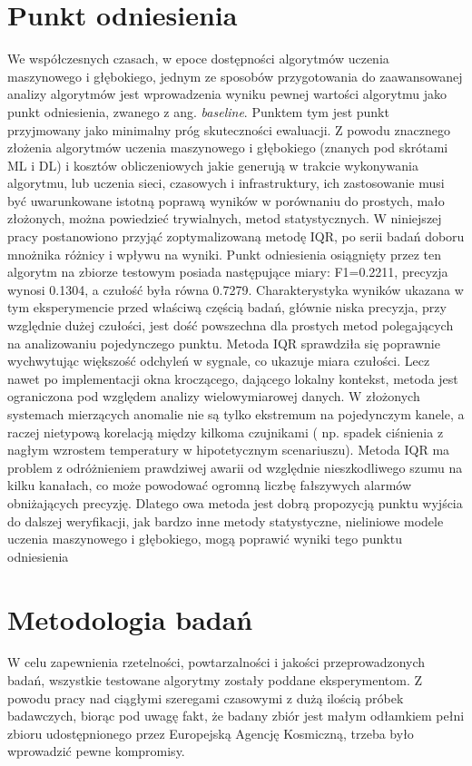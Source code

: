 \documentclass[a4paper,twoside,12pt]{book}
\newcommand{\obcy}[1]{\emph{#1}}
\newcommand{\english}[1]{{\selectlanguage{british}\obcy{#1}}}
\begin{document}
	\section{Punkt odniesienia}
	
	We współczesnych czasach, w epoce dostępności algorytmów uczenia maszynowego i głębokiego, jednym ze sposobów przygotowania do zaawansowanej analizy algorytmów jest wprowadzenia wyniku pewnej wartości algorytmu jako punkt odniesienia, zwanego z ang. \english{baseline}. Punktem tym jest punkt przyjmowany jako minimalny próg skuteczności ewaluacji. Z powodu znacznego złożenia algorytmów uczenia maszynowego i głębokiego (znanych pod skrótami ML i DL) i kosztów obliczeniowych jakie generują w trakcie wykonywania algorytmu, lub uczenia sieci, czasowych i infrastruktury, ich zastosowanie musi być uwarunkowane istotną poprawą wyników w porównaniu do prostych, mało złożonych, można powiedzieć trywialnych, metod statystycznych. 
	W niniejszej pracy postanowiono przyjąć zoptymalizowaną metodę IQR, po serii badań doboru mnożnika różnicy i wpływu na wyniki. Punkt odniesienia osiągnięty przez ten algorytm na zbiorze testowym posiada następujące miary: F1=0.2211, precyzja wynosi 0.1304, a czułość była równa 0.7279.
	Charakterystyka wyników ukazana w tym eksperymencie przed właściwą częścią badań, głównie niska precyzja, przy względnie dużej czułości, jest dość powszechna dla prostych metod polegających na analizowaniu pojedynczego punktu. Metoda IQR sprawdziła się poprawnie wychwytując większość odchyleń w sygnale, co ukazuje miara czułości. Lecz nawet po implementacji okna kroczącego, dającego lokalny kontekst, metoda jest ograniczona pod względem analizy wielowymiarowej danych. W złożonych systemach mierzących anomalie nie są tylko ekstremum na pojedynczym kanele, a raczej nietypową korelacją między kilkoma czujnikami ( np. spadek ciśnienia z nagłym wzrostem temperatury w hipotetycznym scenariuszu). Metoda IQR ma problem z odróżnieniem prawdziwej awarii od względnie nieszkodliwego szumu na kilku kanałach, co może powodować ogromną liczbę fałszywych alarmów obniżających precyzję. Dlatego owa metoda jest dobrą propozycją punktu wyjścia do dalszej weryfikacji, jak bardzo inne metody statystyczne, nieliniowe modele uczenia maszynowego i głębokiego, mogą poprawić wyniki tego punktu odniesienia 
	
	
	\section{Metodologia badań}
	W celu zapewnienia rzetelności, powtarzalności i jakości przeprowadzonych badań, wszystkie testowane algorytmy zostały poddane eksperymentom. Z powodu pracy nad ciągłymi szeregami czasowymi z dużą ilością próbek badawczych, biorąc pod uwagę fakt, że badany zbiór jest małym odłamkiem pełni zbioru udostępnionego przez Europejską Agencję Kosmiczną, trzeba było wprowadzić pewne kompromisy. 
	
\end{document}
